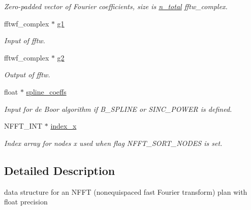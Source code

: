 \begin{DoxyCompactItemize}
\begin{DoxyCompactList}\small\item\em Zero-\/padded vector of Fourier coefficients, size is \hyperlink{structnfftf__plan_a4a8cde81c6ece514d2b36b46aa998842}{n\-\_\-total} fftw\-\_\-complex. \end{DoxyCompactList}\item 
\hypertarget{structnfftf__plan_a01420d5d785228ee24a4819d2b0454a2}{fftwf\-\_\-complex $\ast$ \hyperlink{structnfftf__plan_a01420d5d785228ee24a4819d2b0454a2}{g1}}\label{structnfftf__plan_a01420d5d785228ee24a4819d2b0454a2}

\begin{DoxyCompactList}\small\item\em Input of fftw. \end{DoxyCompactList}\item 
\hypertarget{structnfftf__plan_a4fda15d8d9edaa8de0636b2a458bf763}{fftwf\-\_\-complex $\ast$ \hyperlink{structnfftf__plan_a4fda15d8d9edaa8de0636b2a458bf763}{g2}}\label{structnfftf__plan_a4fda15d8d9edaa8de0636b2a458bf763}

\begin{DoxyCompactList}\small\item\em Output of fftw. \end{DoxyCompactList}\item 
\hypertarget{structnfftf__plan_a65c65de370e29b24ba0da097d20ee262}{float $\ast$ \hyperlink{structnfftf__plan_a65c65de370e29b24ba0da097d20ee262}{spline\-\_\-coeffs}}\label{structnfftf__plan_a65c65de370e29b24ba0da097d20ee262}

\begin{DoxyCompactList}\small\item\em Input for de Boor algorithm if B\-\_\-\-S\-P\-L\-I\-N\-E or S\-I\-N\-C\-\_\-\-P\-O\-W\-E\-R is defined. \end{DoxyCompactList}\item 
N\-F\-F\-T\-\_\-\-I\-N\-T $\ast$ \hyperlink{structnfftf__plan_a1f36e4a372c3fee7b3b2a1ddc0bd889a}{index\-\_\-x}
\begin{DoxyCompactList}\small\item\em Index array for nodes x used when flag N\-F\-F\-T\-\_\-\-S\-O\-R\-T\-\_\-\-N\-O\-D\-E\-S is set. \end{DoxyCompactList}\end{DoxyCompactItemize}


\subsection{Detailed Description}
data structure for an N\-F\-F\-T (nonequispaced fast Fourier transform) plan with float precision 

